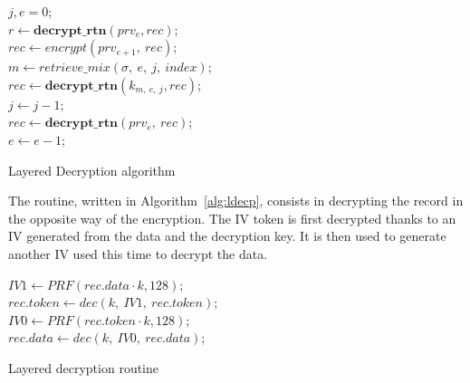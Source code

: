 \documentclass[USenglish,oneside,twocolumn]{article}
\begin{document}
\begin{algorithm}
\DontPrintSemicolon
{}
$j,e=0$;\\
$r\gets \textbf{decrypt\_rtn}(prv_e,rec)$;\\
{
{
$rec \gets encrypt(prv_{e+1},\ rec)$;\\
}
{
	$m\gets retrieve\_mix(\sigma,\ e,\ j,\ index)$;\\
	$rec \gets \textbf{decrypt\_rtn}(k_{m,\ e,\ j}, rec)$;\\
	$j\gets j-1$;\\
}
	$rec \gets \textbf{decrypt\_rtn}(prv_e,\ rec)$;\\
    $e\gets e-1$;\\
}
\caption{Layered Decryption algorithm}
\label{alg:ldec}
\end{algorithm}

The routine, written in Algorithm~\ref{alg:ldecp}, consists in decrypting the record in the opposite way of the encryption. The IV token is first decrypted thanks to an IV generated from the data and the decryption key. It is then used to generate another IV used this time to decrypt the data.
 
\begin{algorithm}
\DontPrintSemicolon
{}
$IV1 \gets PRF(rec.data \cdot k, 128)$;\\
$rec.token \gets dec\left(k,\ IV1,\ rec.token \right )$;\\
$IV0 \gets PRF(rec.token\cdot k, 128)$;\\
$rec.data \gets dec\left(k,\ IV0,\ rec.data \right )$;\\
\caption{Layered decryption routine}
\label{alg:ldecp}
\end{algorithm}
\end{document}
